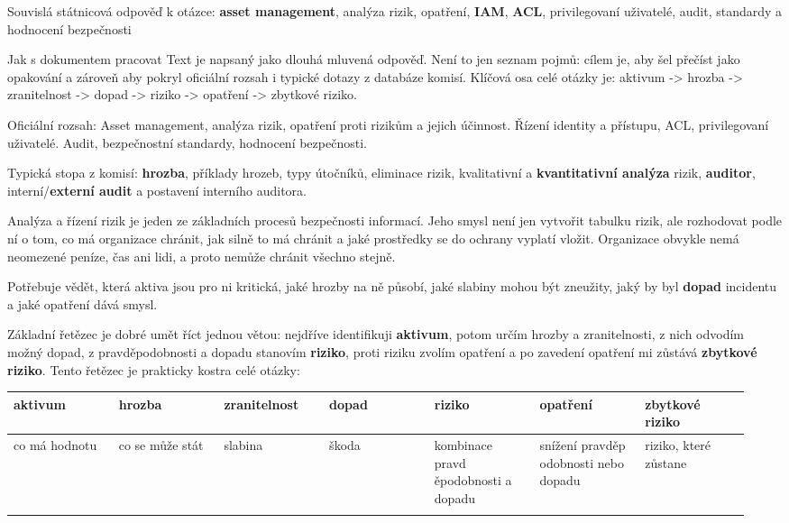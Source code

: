 \documentclass[11pt,a4paper]{article}
\newcommand{\itbox}[1]{\medskip\noindent\colorbox{black!6}{\parbox{\dimexpr\linewidth-2\fboxsep}{#1}}\medskip}
\begin{document}
\iffalse

Souvislá státnicová odpověď k otázce: \textbf{asset management}, analýza rizik, opatření, \textbf{IAM}, \textbf{ACL}, privilegovaní uživatelé, audit, standardy a hodnocení bezpečnosti

\itbox{Jak s dokumentem pracovat Text je napsaný jako dlouhá mluvená odpověď. Není to jen seznam pojmů: cílem je, aby šel přečíst jako opakování a zároveň aby pokryl oficiální rozsah i typické dotazy z databáze komisí. Klíčová osa celé otázky je: aktivum -> hrozba -> zranitelnost -> dopad -> riziko -> opatření -> zbytkové riziko.}

Oficiální rozsah: Asset management, analýza rizik, opatření proti rizikům a jejich účinnost. Řízení identity a přístupu, ACL, privilegovaní uživatelé. Audit, bezpečnostní standardy, hodnocení bezpečnosti.

Typická stopa z komisí: \textbf{hrozba}, příklady hrozeb, typy útočníků, eliminace rizik, kvalitativní a \textbf{kvantitativní analýza} rizik, \textbf{auditor}, interní/\textbf{externí audit} a postavení interního auditora.

Analýza a řízení rizik je jeden ze základních procesů bezpečnosti informací. Jeho smysl není jen vytvořit tabulku rizik, ale rozhodovat podle ní o tom, co má organizace chránit, jak silně to má chránit a jaké prostředky se do ochrany vyplatí vložit. Organizace obvykle nemá neomezené peníze, čas ani lidi, a proto nemůže chránit všechno stejně.

Potřebuje vědět, která aktiva jsou pro ni kritická, jaké hrozby na ně působí, jaké slabiny mohou být zneužity, jaký by byl \textbf{dopad} incidentu a jaké opatření dává smysl.

Základní řetězec je dobré umět říct jednou větou: nejdříve identifikuji \textbf{aktivum}, potom určím hrozby a zranitelnosti, z nich odvodím možný dopad, z pravděpodobnosti a dopadu stanovím \textbf{riziko}, proti riziku zvolím opatření a po zavedení opatření mi zůstává \textbf{zbytkové riziko}. Tento řetězec je prakticky kostra celé otázky:

\begin{longtable}{p{0.136\linewidth}p{0.136\linewidth}p{0.136\linewidth}p{0.136\linewidth}p{0.136\linewidth}p{0.136\linewidth}p{0.136\linewidth}}
\toprule
\textbf{aktivum} & \textbf{hrozba} & \textbf{zranitelnost} & \textbf{dopad} & \textbf{riziko} & \textbf{opatření} & \textbf{zbytkové riziko} \\
\midrule\endhead
co má hodnotu & co se může stát & slabina & škoda & kombinace pravd ěpodobnosti a dopadu & snížení pravděp odobnosti nebo dopadu & riziko, které zůstane \\
\addlinespace
\bottomrule
\end{longtable}
\end{document}
